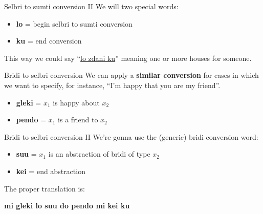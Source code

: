 \begin{frame}{Selbri to sumti conversion II}
    We will two special words:
    \begin{itemize}
        \item \textbf{lo} = begin selbri to sumti conversion
        \item \textbf{ku} = end conversion
    \end{itemize}

    This way we could say ``\underline{lo zdani ku}'' meaning one or more houses for someone.
\end{frame}

\begin{frame}{Bridi to selbri conversion}
    We can apply a \textbf{similar conversion} for cases in which we want to specify, for instance, ``I'm happy that you are my friend''.

    \begin{itemize}
        \item \textbf{gleki} = $x_1$ is happy about $x_2$
        \item \textbf{pendo} = $x_1$ is a friend to $x_2$
    \end{itemize}
\end{frame}

\begin{frame}{Bridi to selbri conversion II}
    We're gonna use the (generic) bridi conversion word:

    \begin{itemize}
        \item \textbf{su\textquotesingle u} = $x_1$ is an abstraction of bridi of type $x_2$
        \item \textbf{kei} = end abstraction
    \end{itemize}

    \pause
    The proper translation is:
    \begin{center}
        \textbf{mi gleki lo su\textquotesingle u do pendo mi kei ku}
    \end{center}
\end{frame}
